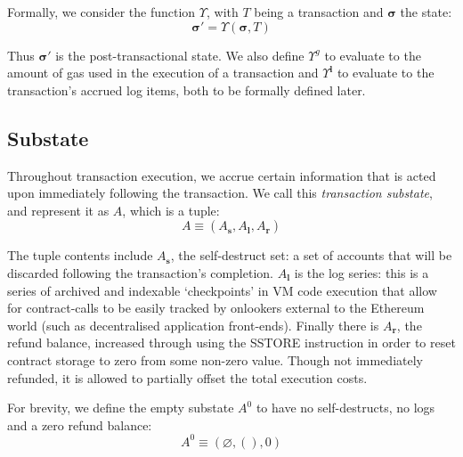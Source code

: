 \documentclass[9pt,oneside]{amsart}
\begin{document}
\begin{multicols}{2}
Formally, we consider the function \hyperlink{Upsilon}{$\Upsilon$}, with $T$ being a transaction and $\boldsymbol{\sigma}$ the state:
\begin{equation}
\boldsymbol{\sigma}' = \Upsilon(\boldsymbol{\sigma}, T)
\end{equation}

Thus $\boldsymbol{\sigma}'$ is the post-transactional state. We also define \hyperlink{Upsilong}{$\Upsilon^g$} to evaluate to the amount of gas used in the execution of a transaction and \hyperlink{Upsilonl}{$\Upsilon^\mathbf{l}$} to evaluate to the transaction's accrued log items, both to be formally defined later.

\subsection{Substate}
Throughout transaction execution, we accrue certain information that is acted upon immediately following the transaction. We call this \textit{transaction substate}, and represent it as $A$, which is a tuple:
\begin{equation}
A \equiv (A_\mathbf{s}, A_\mathbf{l}, A_\mathbf{r})
\end{equation}

The tuple contents include $A_\mathbf{s}$, the self-destruct set: a set of accounts that will be discarded following the transaction's completion. $A_\mathbf{l}$ is the log series: this is a series of archived and indexable `checkpoints' in VM code execution that allow for contract-calls to be easily tracked by onlookers external to the Ethereum world (such as decentralised application front-ends). Finally there is $A_\mathbf{r}$, the refund balance, increased through using the {\small SSTORE} instruction in order to reset contract storage to zero from some non-zero value. Though not immediately refunded, it is allowed to partially offset the total execution costs.

For brevity, we define the empty substate $A^0$ to have no self-destructs, no logs and a zero refund balance:
\begin{equation}
A^0 \equiv (\varnothing, (), 0)
\end{equation}


\end{multicols}
\end{document}
